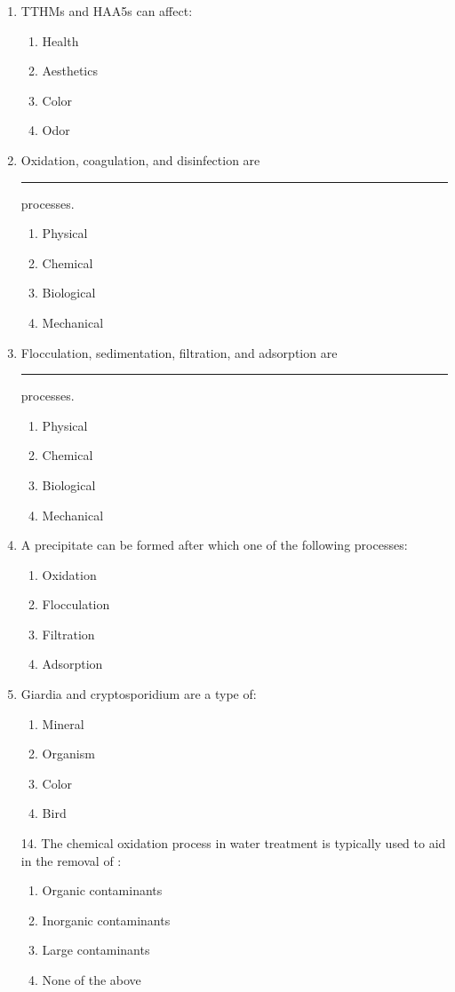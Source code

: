 \documentclass{article}
\begin{document}
\begin{enumerate}
\item TTHMs and HAA5s can affect:
\begin{enumerate}
\item Health
\item Aesthetics
\item Color
\item Odor
\end{enumerate}

\item Oxidation, coagulation, and disinfection are \rule{1cm}{0.5pt}  processes.
\begin{enumerate}
\item Physical
\item Chemical
\item Biological
\item Mechanical
\end{enumerate}

\item Flocculation, sedimentation, filtration, and adsorption are \rule{1cm}{0.5pt} processes.
\begin{enumerate}
\item Physical
\item Chemical
\item Biological
\item Mechanical
\end{enumerate}

\item A precipitate can be formed after which one of the following processes:
\begin{enumerate}
\item Oxidation
\item Flocculation
\item Filtration
\item Adsorption
\end{enumerate}

\item Giardia and cryptosporidium are a type of:
\begin{enumerate}
\item Mineral
\item Organism
\item Color
\item Bird
\end{enumerate}

14. The chemical oxidation process in water treatment is typically used to aid in the
removal of :
\begin{enumerate}
\item Organic contaminants
\item Inorganic contaminants
\item Large contaminants
\item None of the above
\end{enumerate}


\end{enumerate}
\end{document}
